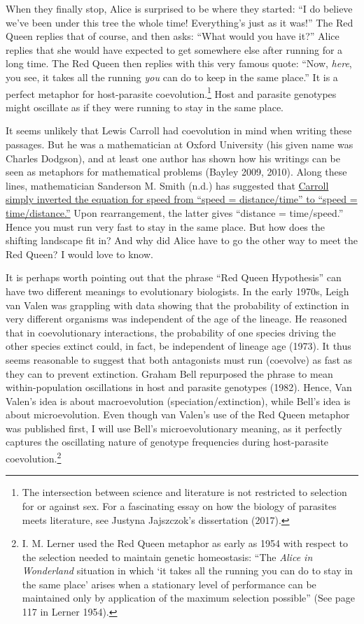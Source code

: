 \documentclass[
  letterpaper,
]{book}
\begin{document}
When they finally stop, Alice is surprised to be where they started: ``I
do believe we've been under this tree the whole time! Everything's just
as it was!'' The Red Queen replies that of course, and then asks: ``What
would you have it?'' Alice replies that she would have expected to get
somewhere else after running for a long time. The Red Queen then replies
with this very famous quote: ``Now, \emph{here}, you see, it takes all
the running \emph{you} can do to keep in the same place.'' It is a
perfect metaphor for host-parasite coevolution.\footnote{The
  intersection between science and literature is not restricted to
  selection for or against sex. For a fascinating essay on how the
  biology of parasites meets literature, see Justyna Jajszczok's
  dissertation (2017).} Host and parasite genotypes might oscillate as
if they were running to stay in the same place.

It seems unlikely that Lewis Carroll had coevolution in mind when
writing these passages. But he was a mathematician at Oxford University
(his given name was Charles Dodgson), and at least one author has shown
how his writings can be seen as metaphors for mathematical problems
(Bayley 2009, 2010). Along these lines, mathematician Sanderson M. Smith
(n.d.) has suggested that
\href{http://www.herkimershideaway.org/writings/carroll.htm}{Carroll
simply inverted the equation for speed from ``speed = distance/time'' to
``speed = time/distance.''} Upon rearrangement, the latter gives
``distance = time/speed.'' Hence you must run very fast to stay in the
same place. But how does the shifting landscape fit in? And why did
Alice have to go the other way to meet the Red Queen? I would love to
know.

It is perhaps worth pointing out that the phrase ``Red Queen
Hypothesis'' can have two different meanings to evolutionary biologists.
In the early 1970s, Leigh van Valen was grappling with data showing that
the probability of extinction in very different organisms was
independent of the age of the lineage. He reasoned that in
coevolutionary interactions, the probability of one species driving the
other species extinct could, in fact, be independent of lineage age
(1973). It thus seems reasonable to suggest that both antagonists must
run (coevolve) as fast as they can to prevent extinction. Graham Bell
repurposed the phrase to mean within-population oscillations in host and
parasite genotypes (1982). Hence, Van Valen's idea is about
macroevolution (speciation/extinction), while Bell's idea is about
microevolution. Even though van Valen's use of the Red Queen metaphor
was published first, I will use Bell's microevolutionary meaning, as it
perfectly captures the oscillating nature of genotype frequencies during
host-parasite coevolution.\footnote{I. M. Lerner used the Red Queen
  metaphor as early as 1954 with respect to the selection needed to
  maintain genetic homeostasis: ``The \emph{Alice in Wonderland}
  situation in which `it takes all the running you can do to stay in the
  same place' arises when a stationary level of performance can be
  maintained only by application of the maximum selection possible''
  (See page 117 in Lerner 1954).}
\end{document}
